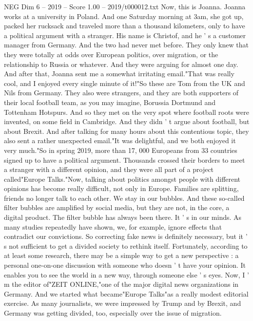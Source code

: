 \begin{textsample}{NEG Dim 6 – 2019 – Score 1.00 – 2019/t000012.txt}  \label{ex:f6_neg_013}
Now, this is Joanna.
Joanna works at a university in Poland.
And one Saturday morning at 3am, she got up, packed her rucksack and traveled more than a thousand kilometers, only to have a political argument with a stranger.
His name is Christof, and he ' s a customer manager from Germany.
And the two had never met before.
They only knew that they were totally at odds over European politics, over migration, or the relationship to Russia or whatever.
And they were arguing for almost one day.
And after that, Joanna sent me a somewhat irritating email."That was really cool, and I enjoyed every single minute of it!"So these are Tom from the UK and Nils from Germany.
They also were strangers, and they are both supporters of their local football team, as you may imagine, Borussia Dortmund and Tottenham Hotspurs.
And so they met on the very spot where football roots were invented, on some field in Cambridge.
And they didn ' t argue about football, but about Brexit.
And after talking for many hours about this contentious topic, they also sent a rather unexpected email."It was delightful, and we both enjoyed it very much."So in spring 2019, more than 17, 000 Europeans from 33 countries signed up to have a political argument.
Thousands crossed their borders to meet a stranger with a different opinion, and they were all part of a project called"Europe Talks."Now, talking about politics amongst people with different opinions has become really difficult, not only in Europe.
Families are splitting, friends no longer talk to each other.
We stay in our bubbles.
And these so-called filter bubbles are amplified by social media, but they are not, in the core, a digital product.
The filter bubble has always been there.
It ' s in our minds.
As many studies repeatedly have shown, we, for example, ignore effects that contradict our convictions.
So correcting fake news is definitely necessary, but it ' s not sufficient to get a divided society to rethink itself.
Fortunately, according to at least some research, there may be a simple way to get a new perspective : a personal one-on-one discussion with someone who doesn ' t have your opinion.
It enables you to see the world in a new way, through someone else ' s eyes.
Now, I ' m the editor of"ZEIT ONLINE,"one of the major digital news organizations in Germany.
And we started what became"Europe Talks"as a really modest editorial exercise.
As many journalists, we were impressed by Trump and by Brexit, and Germany was getting divided, too, especially over the issue of migration.

\end{textsample}
